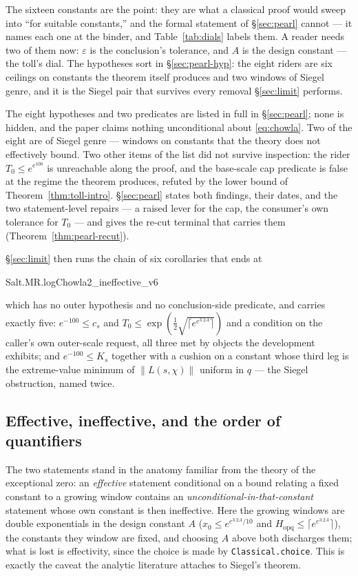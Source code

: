\documentclass[11pt]{amsart}
\newcommand{\leanname}[1]{\par{\noindent\small\ttfamily\raggedright #1\par}}
\theoremstyle{remark}
\begin{document}
The sixteen constants are the point: they are what a classical proof
would sweep into ``for suitable constants,'' and the formal statement
of \S\ref{sec:pearl} cannot --- it names each one at the binder, and
Table~\ref{tab:dials} labels them. A reader needs two of them now:
$\varepsilon$ is the conclusion's tolerance, and $A$ is the design
constant --- the toll's dial. The hypotheses sort in
\S\ref{sec:pearl-hyp}: the eight riders are six ceilings on constants
the theorem itself produces and two windows of Siegel genre, and it is
the Siegel pair that survives every removal \S\ref{sec:limit}
performs.

The eight hypotheses and two predicates are listed in full in
\S\ref{sec:pearl}; none is hidden, and the paper claims nothing
unconditional about \eqref{eq:chowla}. Two of the eight are of Siegel
genre --- windows on constants that the theory does not effectively bound.
Two other items of the list did not survive inspection: the rider
$T_0 \le e^{e^{100}}$ is unreachable along the proof, and the base-scale
cap predicate is false at the regime the theorem produces, refuted by the
lower bound of Theorem~\ref{thm:toll-intro}. \S\ref{sec:pearl} states both
findings, their dates, and the two statement-level repairs --- a raised
lever for the cap, the consumer's own tolerance for $T_0$ --- and gives the
re-cut terminal that carries them (Theorem~\ref{thm:pearl-recut}).

\S\ref{sec:limit} then runs the chain of six corollaries that ends at
\leanname{Salt.MR.logChowla2\_ineffective\_v6}
which has no outer hypothesis and no conclusion-side predicate, and carries
exactly five: $e^{-100} \le c_s$ and
$T_0 \le \exp(\tfrac12\sqrt{\lceil e^{e^{3.2A}}\rceil})$ and a condition on
the caller's own outer-scale request, all three met by objects the
development exhibits; and $e^{-100} \le K_s$ together with a cushion on a
constant whose third leg is the extreme-value minimum of $\|L(s,\chi)\|$
uniform in $q$ --- the Siegel obstruction, named twice.

\subsection{Effective, ineffective, and the order of quantifiers}
The two statements stand in the anatomy familiar from the theory of the
exceptional zero: an \emph{effective} statement conditional on a bound
relating a fixed constant to a growing window contains an
\emph{unconditional-in-that-constant} statement whose own constant is then
ineffective. Here the growing windows are double exponentials in the
design constant $A$ ($x_0 \le e^{e^{3.2A}/10}$ and
$H_{\mathrm{opq}} \le \lceil e^{e^{3.2A}}\rceil$), the constants they
window are fixed, and choosing $A$ above both discharges them; what is
lost is effectivity, since the choice is made by
\texttt{Classical.choice}. This is exactly the caveat the analytic
literature attaches to Siegel's theorem.
\end{document}
